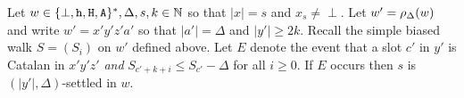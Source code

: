 \begin{lemma}\label{lemma:async-catalan-uvp}
  Let $w \in \{\perp, \mathtt{h}, \mathtt{H}, \mathtt{A}\}^*, \Delta, s, k \in \mathbb{N}$ 
  so that $|x| = s$ and $x_{s} \neq \perp$. 
  Let $w' = \rho_\Delta(w)$ and 
  write $w' = x'y'z'a'$ so that $|a'| = \Delta$ and $|y'| \geq 2k$. 
  Recall the simple biased walk $S = (S_i)$ on $w'$ defined above.
  Let $E$ denote the event that 
  a slot $c'$ in $y'$ is Catalan in $x'y'z'$ 
  \emph{and} $S_{c' + k + i} \leq S_{c'} - \Delta$ for all $i \geq 0$.
  If $E$ occurs then 
  $s$ is $(|y'|,\Delta)$-settled in $w$. 
\end{lemma}
